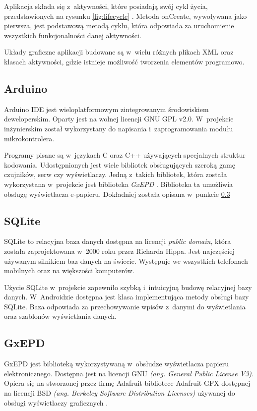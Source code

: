 \documentclass[a4paper,12pt, twoside]{article}
\begin{document}
    	Aplikacja składa się z~aktywności, które posiadają swój cykl życia, przedstawionych na rysunku \ref{fig:lifecycle} \cite{lifecycle}. Metoda onCreate, wywoływana jako pierwsza, jest podstawową metodą cyklu, która odpowiada za uruchomienie wszystkich funkcjonalności danej aktywności.
    	
    	Układy graficzne aplikacji budowane są w~wielu różnych plikach XML oraz klasach aktywności, gdzie istnieje możliwość tworzenia elementów programowo.
    	
    	\subsection{Arduino}
    	Arduino IDE jest wieloplatformowym zintegrowanym środowiskiem deweloperskim. Oparty jest na wolnej licencji GNU GPL v2.0. W~projekcie inżynierskim został wykorzystany do napisania i~zaprogramowania modułu mikrokontrolera.
    	
    	Programy pisane są w~językach C oraz C++ używających specjalnych struktur kodowania. Udostępnionych jest wiele bibliotek obsługujących szeroką gamę czujników, serw czy wyświetlaczy. Jedną z~takich bibliotek, która została wykorzystana w~projekcie jest biblioteka \textit{GxEPD} \cite{gxepd}. Biblioteka ta umożliwia obsługę wyświetlacza e-papieru. Dokładniej została opisana w~punkcie \ref{GxEPD}
    	
    	\subsection{SQLite}
    	SQLite to relacyjna baza danych dostępna na licencji \textit{public domain}\cite{publicdomain}, która została zaprojektowana w~2000 roku przez Richarda Hippa. Jest najczęściej używanym silnikiem baz danych na świecie. Występuje we wszystkich telefonach mobilnych oraz na większości komputerów. 
    	
    	Użycie SQLite w~projekcie zapewniło szybką i~intuicyjną budowę relacyjnej bazy danych. W~Androidzie dostępna jest klasa implementująca metody obsługi bazy SQLite. Baza odpowiada za przechowywanie wpisów z~danymi do wyświetlania oraz szablonów wyświetlania danych. 
    	
    	\subsection{GxEPD}\label{GxEPD}
    	GxEPD jest biblioteką wykorzystywaną w~obsłudze wyświetlacza papieru elektronicznego. Dostępna jest na licencji GNU \textit{(ang. General Public License V3)}. Opiera się na stworzonej przez firmę Adafruit bibliotece Adafruit GFX dostępnej na licencji BSD \textit{(ang. Berkeley Software Distribution Licenses)} używanej do obsługi wyświetlaczy graficznych \cite{adafruit}. 
    	
\end{document}
